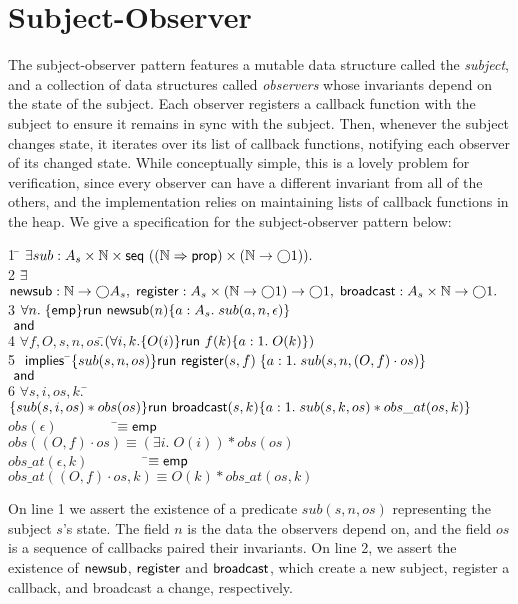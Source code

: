 \documentclass[preprint,natbib]{sigplanconf}
\begin{document}
\section{Subject-Observer}
The subject-observer pattern features a mutable data structure called
the \emph{subject}, and a collection of data structures called
\emph{observers} whose invariants depend on the state of the
subject. Each observer registers a callback function with the subject
to ensure it remains in sync with the subject. Then, whenever the
subject changes state, it iterates over its list of callback
functions, notifying each observer of its changed state. While
conceptually simple, this is a lovely problem for verification, since
every observer can have a different invariant from all of the others,
and the implementation relies on maintaining lists of callback
functions in the heap.  We give a specification for the
subject-observer pattern below:
{\small
\begin{tabbing}
1 \qquad \= $\exists sub : A_s \times \mathbb{N} \times \mbox{\textsf{{seq }}}{((\mathbb{N}\Rightarrow\mbox{\textsf{{prop}}}) \times (\mathbb{N}\to \bigcirc{1}))}.$ \\
2 \> $\exists$\=$ \mbox{\textsf{{newsub}}} : \mathbb{N} \to \bigcirc{A_s}, \;
              \mbox{\textsf{{register}}} : A_s \times (\mathbb{N} \to \bigcirc{1}) \to \bigcirc{1},\;
              \mbox{\textsf{{broadcast}}} : A_s \times \mathbb{N} \to \bigcirc{1}.$ 
\\[0.5em]
3 \>$\forall n.\; \{{\mathsf{emp}}\}{\mbox{\textsf{{run }}}{\mbox{\textsf{{newsub}}}(n)}}\{{a:A_s}.\;{sub(a, n, \epsilon)}\}$ \\
\> $\mbox{\textsf{{ and }}}$ \\
4 \> $\forall f, O, s, n, os. $\=$(\forall i, k. \{{O(i)}\}{\mbox{\textsf{{run }}}{f(k)}}\{{a:1}.\;{O(k)}\})$ \\
5\> \>$\mbox{\textsf{{ implies }}}$\=$\{{sub(s, n, os)}\}
\mbox{\textsf{{run }}}{\mbox{\textsf{{register}}}(s, f)}
\;\{{a:1.\; sub(s, n, (O,f)\cdot os)}\}$ \\
\> $\mbox{\textsf{{ and }}}$ \\
6 \> $\forall s,i,os,k.\; $\=
     $\{{sub(s, i, os) * obs(os)}\}
      \mbox{\textsf{{run }}}{\mbox{\textsf{{broadcast}}}}(s,k)
      \{{a:1.\; sub(s, k, os) * obs\_at(os, k)}\}$ 
\\[0.5em]
$obs(\epsilon) \;\qquad\qquad $\=$\equiv \mathsf{emp}$ \\
$obs((O,f)\cdot os) $\>$\equiv (\exists i.\; O(i)) * obs(os)$ 
\\[0.5em]
$obs\_at(\epsilon, k) \;\qquad\qquad $\=$\equiv \mathsf{emp}$ \\
$obs\_at((O,f)\cdot os, k) $\>$\equiv O(k) * obs\_at(os, k)$ 
\\
\end{tabbing}
}
On line 1 we assert the existence of a predicate $sub(s, n, os)$
representing the subject $s$'s state. The field $n$ is the data the
observers depend on, and the field $os$ is a sequence of callbacks
paired their invariants. On line 2, we assert the existence of
$\mbox{\textsf{{newsub}}}$, $\mbox{\textsf{{register}}}$ and $\mbox{\textsf{{broadcast}}}$, which
create a new subject, register a callback, and broadcast a change,
respectively.
\end{document}

